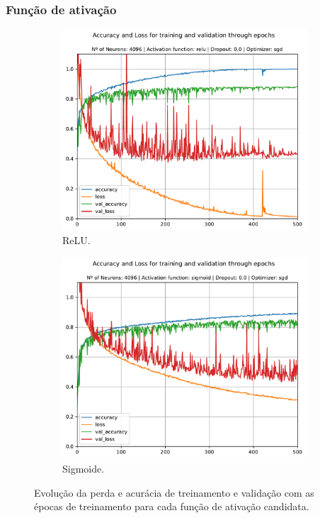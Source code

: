 \subsubsection{Função de ativação}

\begin{figure}[H]
	\centering
	\begin{subfigure}[H]{0.49\textwidth}
		\includegraphics[width = \textwidth]{../../plot/mlp/mlp_4096_relu_0.0_sgd}
		\caption{ReLU.}
		\label{fig:mlp_4096_relu_0.0_sgd_act_fnc}
	\end{subfigure}
	\begin{subfigure}[H]{0.49\textwidth}
		\centering
		\includegraphics[width = \textwidth]{../../plot/mlp/mlp_4096_sigmoid_0.0_sgd}
		\caption{Sigmoide.}
		\label{fig:mlp_4096_sigmoid_0.0_sgd}
	\end{subfigure}
	\caption{Evolução da perda e acurácia de treinamento e validação com as épocas de treinamento para cada função de ativação candidata.}
\end{figure}

